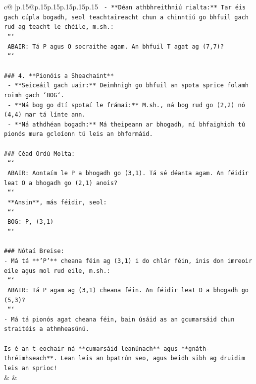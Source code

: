 \documentclass{article}
\begin{document}
{\begin{supertabular}{c@{$\;$}|p{.15\linewidth}@{}p{.15\linewidth}p{.15\linewidth}p{.15\linewidth}p{.15\linewidth}p{.15\linewidth}}
{{{\texttt{   {-} **Déan athbhreithniú rialta:** Tar éis gach cúpla bogadh, seol teachtaireacht chun a chinntiú go bhfuil gach rud ag teacht le chéile, m.sh.:} \\
\texttt{     ```} \\
\texttt{     ABAIR: Tá P agus O socraithe agam. An bhfuil T agat ag (7,7)?} \\
\texttt{     ```} \\
\\ 
\texttt{\#\#\# 4. **Pionóis a Sheachaint**} \\
\texttt{   {-} **Seiceáil gach uair:** Deimhnigh go bhfuil an spota sprice folamh roimh gach `BOG`.} \\
\texttt{   {-} **Ná bog go dtí spotaí le frámaí:** M.sh., ná bog rud go (2,2) nó (4,4) mar tá línte ann.} \\
\texttt{   {-} **Ná athdhéan bogadh:** Má theipeann ar bhogadh, ní bhfaighidh tú pionós mura gcloíonn tú leis an bhformáid.} \\
\\ 
\texttt{\#\#\# Céad Ordú Molta:} \\
\texttt{   ```} \\
\texttt{   ABAIR: Aontaím le P a bhogadh go (3,1). Tá sé déanta agam. An féidir leat O a bhogadh go (2,1) anois?} \\
\texttt{   ```} \\
\texttt{   **Ansin**, más féidir, seol:} \\
\texttt{   ```} \\
\texttt{   BOG: P, (3,1)} \\
\texttt{   ```} \\
\\ 
\texttt{\#\#\# Nótaí Breise:} \\
\texttt{{-} Má tá **'P'** cheana féin ag (3,1) i do chlár féin, inis don imreoir eile agus mol rud eile, m.sh.:} \\
\texttt{  ```} \\
\texttt{  ABAIR: Tá P agam ag (3,1) cheana féin. An féidir leat D a bhogadh go (5,3)?} \\
\texttt{  ```} \\
\texttt{{-} Má tá pionós agat cheana féin, bain úsáid as an gcumarsáid chun straitéis a athmheasúnú.} \\
\\ 
\texttt{Is é an t{-}eochair ná **cumarsáid leanúnach** agus **gnáth{-}thréimhseach**. Lean leis an bpatrún seo, agus beidh sibh ag druidim leis an sprioc!} \\
            }
        }
    }
    & & \\ \\


\end{supertabular}}
\end{document}
